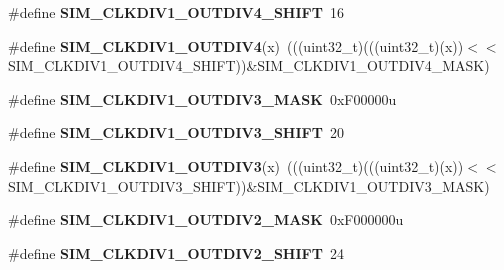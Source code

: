 \begin{DoxyCompactItemize}
\item 
\#define {\bfseries S\+I\+M\+\_\+\+C\+L\+K\+D\+I\+V1\+\_\+\+O\+U\+T\+D\+I\+V4\+\_\+\+S\+H\+I\+FT}~16\hypertarget{group__SIM__Register__Masks_ga053a7a1ffc9f3b6834679c63ca0ebe29}{}\label{group__SIM__Register__Masks_ga053a7a1ffc9f3b6834679c63ca0ebe29}

\item 
\#define {\bfseries S\+I\+M\+\_\+\+C\+L\+K\+D\+I\+V1\+\_\+\+O\+U\+T\+D\+I\+V4}(x)~(((uint32\+\_\+t)(((uint32\+\_\+t)(x))$<$$<$S\+I\+M\+\_\+\+C\+L\+K\+D\+I\+V1\+\_\+\+O\+U\+T\+D\+I\+V4\+\_\+\+S\+H\+I\+FT))\&S\+I\+M\+\_\+\+C\+L\+K\+D\+I\+V1\+\_\+\+O\+U\+T\+D\+I\+V4\+\_\+\+M\+A\+SK)\hypertarget{group__SIM__Register__Masks_ga4e380b274f15fdde19e4fbd5c341a728}{}\label{group__SIM__Register__Masks_ga4e380b274f15fdde19e4fbd5c341a728}

\item 
\#define {\bfseries S\+I\+M\+\_\+\+C\+L\+K\+D\+I\+V1\+\_\+\+O\+U\+T\+D\+I\+V3\+\_\+\+M\+A\+SK}~0x\+F00000u\hypertarget{group__SIM__Register__Masks_ga0a017e7ea9a2d31e9b23aa2cab06c19d}{}\label{group__SIM__Register__Masks_ga0a017e7ea9a2d31e9b23aa2cab06c19d}

\item 
\#define {\bfseries S\+I\+M\+\_\+\+C\+L\+K\+D\+I\+V1\+\_\+\+O\+U\+T\+D\+I\+V3\+\_\+\+S\+H\+I\+FT}~20\hypertarget{group__SIM__Register__Masks_gab5533e40e65e365a9bb32edf707ac9f0}{}\label{group__SIM__Register__Masks_gab5533e40e65e365a9bb32edf707ac9f0}

\item 
\#define {\bfseries S\+I\+M\+\_\+\+C\+L\+K\+D\+I\+V1\+\_\+\+O\+U\+T\+D\+I\+V3}(x)~(((uint32\+\_\+t)(((uint32\+\_\+t)(x))$<$$<$S\+I\+M\+\_\+\+C\+L\+K\+D\+I\+V1\+\_\+\+O\+U\+T\+D\+I\+V3\+\_\+\+S\+H\+I\+FT))\&S\+I\+M\+\_\+\+C\+L\+K\+D\+I\+V1\+\_\+\+O\+U\+T\+D\+I\+V3\+\_\+\+M\+A\+SK)\hypertarget{group__SIM__Register__Masks_gaeccf89240795d88d055b49719b820c14}{}\label{group__SIM__Register__Masks_gaeccf89240795d88d055b49719b820c14}

\item 
\#define {\bfseries S\+I\+M\+\_\+\+C\+L\+K\+D\+I\+V1\+\_\+\+O\+U\+T\+D\+I\+V2\+\_\+\+M\+A\+SK}~0x\+F000000u\hypertarget{group__SIM__Register__Masks_gad2d7b5c991f6db7ab2a3e6bc4d9c6aae}{}\label{group__SIM__Register__Masks_gad2d7b5c991f6db7ab2a3e6bc4d9c6aae}

\item 
\#define {\bfseries S\+I\+M\+\_\+\+C\+L\+K\+D\+I\+V1\+\_\+\+O\+U\+T\+D\+I\+V2\+\_\+\+S\+H\+I\+FT}~24\hypertarget{group__SIM__Register__Masks_ga6d6fd31143c3871c916062966b6fbc3b}{}\label{group__SIM__Register__Masks_ga6d6fd31143c3871c916062966b6fbc3b}


\end{DoxyCompactItemize}
